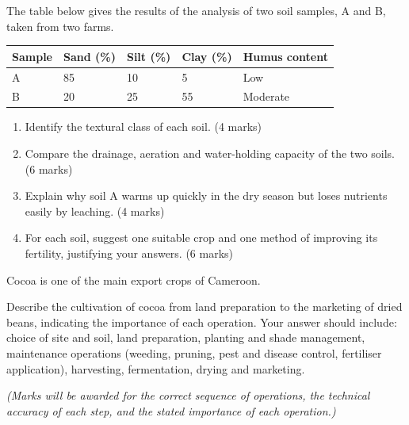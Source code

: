 \documentclass[11pt]{article}
\begin{document}
\begin{exercice}
The table below gives the results of the analysis of two soil samples, A and B, taken from two farms.

\begin{center}
\begin{tabularx}{\linewidth}{|l|X|X|X|X|}
\hline
\rowcolor{popblueL} \textbf{Sample} & \textbf{Sand (\%)} & \textbf{Silt (\%)} & \textbf{Clay (\%)} & \textbf{Humus content} \\
\hline
A & 85 & 10 & 5 & Low \\
\hline
B & 20 & 25 & 55 & Moderate \\
\hline
\end{tabularx}
\end{center}

\begin{enumerate}
\item Identify the textural class of each soil. \hfill (4 marks)
\item Compare the drainage, aeration and water-holding capacity of the two soils. \hfill (6 marks)
\item Explain why soil A warms up quickly in the dry season but loses nutrients easily by leaching. \hfill (4 marks)
\item For each soil, suggest one suitable crop and one method of improving its fertility, justifying your answers. \hfill (6 marks)
\end{enumerate}
\end{exercice}

\begin{exercice}
Cocoa is one of the main export crops of Cameroon.\par
Describe the cultivation of cocoa from land preparation to the marketing of dried beans, indicating the importance of each operation. Your answer should include: choice of site and soil, land preparation, planting and shade management, maintenance operations (weeding, pruning, pest and disease control, fertiliser application), harvesting, fermentation, drying and marketing.\par
\emph{(Marks will be awarded for the correct sequence of operations, the technical accuracy of each step, and the stated importance of each operation.)}
\end{exercice}
\end{document}
